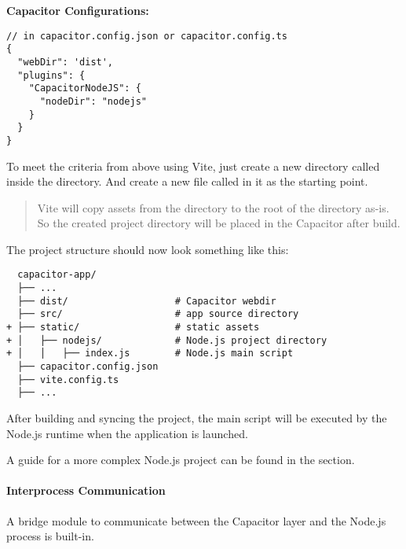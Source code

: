 \textbf{Capacitor Configurations:}

\begin{verbatim}
// in capacitor.config.json or capacitor.config.ts
{
  "webDir": 'dist',
  "plugins": {
    "CapacitorNodeJS": {
      "nodeDir": "nodejs"
    }
  }
}
\end{verbatim}

\vspace{1em}

To meet the criteria from above using Vite, just create a new directory called  inside the  directory.
And create a new file called  in it as the starting point.

\begin{quote}
  Vite will copy assets from the  directory to the root of the  directory as-is.~\cite{vite}
  So the created  project directory will be placed in the Capacitor  after build.
\end{quote}

\vspace{1em}

The project structure should now look something like this:

\begin{verbatim}
  capacitor-app/
  ├── ...
  ├── dist/                   # Capacitor webdir
  ├── src/                    # app source directory
+ ├── static/                 # static assets
+ │   ├── nodejs/             # Node.js project directory
+ │   │   ├── index.js        # Node.js main script
  ├── capacitor.config.json
  ├── vite.config.ts
  ├── ...
\end{verbatim}

\vspace{1em}

After building and syncing the project, the main script will be executed by the Node.js runtime when the application is launched.

A guide for a more complex Node.js project can be found in the  section.

\paragraph{Interprocess Communication}
\label{sec:Capacitor-NodeJS:InterprocessCommunication}

A bridge module to communicate between the Capacitor layer and the Node.js process is built-in.

